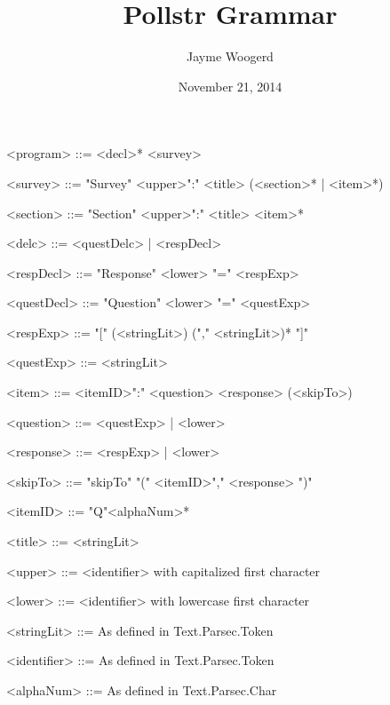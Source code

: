 \documentclass{article}
\title{Pollstr Grammar}
\author{Jayme Woogerd}
\date{November 21, 2014}
\begin{document}
\maketitle
\thispagestyle{empty}

\begin{grammar}

    <program>    ::= <decl>* <survey>

    <survey>     ::= "Survey"  <upper>":" <title> (<section>* | <item>*)

    <section>    ::= "Section" <upper>":" <title> <item>* 

    <delc>       ::= <questDelc> | <respDecl>

    <respDecl>   ::= "Response" <lower> "=" <respExp>

    <questDecl>  ::= "Question" <lower> "=" <questExp>

    <respExp>    ::= "[" (<stringLit>) ("," <stringLit>)* "]"

    <questExp>   ::= <stringLit>

    <item>       ::= <itemID>":" <question> <response> (<skipTo>)

    <question>   ::= <questExp> | <lower>

    <response>   ::= <respExp> | <lower>

    <skipTo>     ::= "skipTo" "(" <itemID>"," <response> ")"

    <itemID>     ::= "Q"<alphaNum>*

    <title>      ::= <stringLit>

    <upper>      ::= <identifier> with capitalized first character
    
    <lower>      ::= <identifier> with lowercase first character

    <stringLit>  ::= As defined in Text.Parsec.Token

    <identifier> ::= As defined in Text.Parsec.Token

    <alphaNum> ::= As defined in Text.Parsec.Char


\end{grammar}
\end{document}
